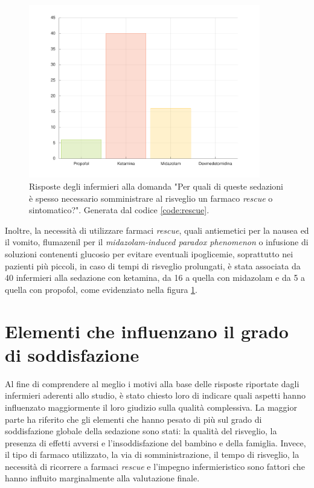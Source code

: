 \begin{figure}[!h]
    \centering
    \includegraphics[width=0.9\textwidth]{Figure/rescue.pdf}
    \caption{Risposte degli infermieri alla domanda "Per quali di queste sedazioni è spesso necessario somministrare al risveglio un farmaco \emph{rescue} o sintomatico?". Generata dal codice \ref{code:rescue}.}
    \label{fig:rescue}
\end{figure}

Inoltre, la necessità di utilizzare farmaci \emph{rescue}, quali antiemetici per la nausea ed il vomito, flumazenil per il \emph{midazolam-induced paradox phenomenon} o infusione di soluzioni contenenti glucosio per evitare eventuali ipoglicemie, soprattutto nei pazienti più piccoli, in caso di tempi di risveglio prolungati, è stata associata da 40 infermieri alla sedazione con ketamina, da 16 a quella con midazolam e da 5 a quella con propofol, come evidenziato nella figura \ref{fig:rescue}.


\section{Elementi che influenzano il grado di soddisfazione}

Al fine di comprendere al meglio i motivi alla base delle risposte riportate dagli infermieri aderenti allo studio, è stato chiesto loro di indicare quali aspetti hanno influenzato maggiormente il loro giudizio sulla qualità complessiva. La maggior parte ha riferito che gli elementi che hanno pesato di più sul grado di soddisfazione globale della sedazione sono stati: la qualità del risveglio, la presenza di effetti avversi e l'insoddisfazione del bambino e della famiglia. Invece, il tipo di farmaco utilizzato, la via di somministrazione, il tempo di risveglio, la necessità di ricorrere a farmaci \emph{rescue} e l'impegno infermieristico sono fattori che hanno influito marginalmente alla valutazione finale.

